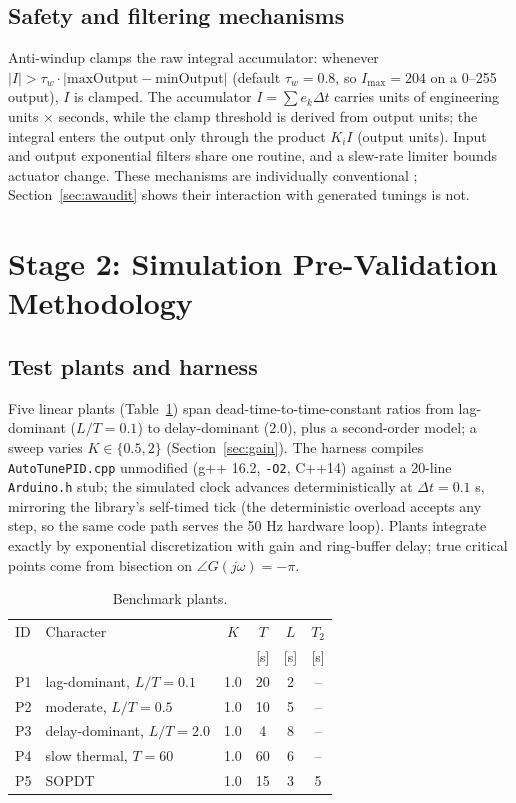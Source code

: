 \documentclass[10pt,twocolumn]{article}
\begin{document}
\subsection{Safety and filtering mechanisms}

Anti-windup clamps the raw integral accumulator: whenever $|I| > \tau_w \cdot |\text{maxOutput} - \text{minOutput}|$ (default $\tau_w = 0.8$, so $I_{\max} = 204$ on a 0--255 output), $I$ is clamped. The accumulator $I = \sum e_k \Delta t$ carries units of engineering units $\times$ seconds, while the clamp threshold is derived from output units; the integral enters the output only through the product $K_i I$ (output units). Input and output exponential filters share one routine, and a slew-rate limiter bounds actuator change. These mechanisms are individually conventional \cite{astrom2006, visioli2006}; Section~\ref{sec:awaudit} shows their interaction with generated tunings is not.

\section{Stage 2: Simulation Pre-Validation Methodology}
\label{sec:simmethod}

\subsection{Test plants and harness}

Five linear plants (Table~\ref{tab:plants}) span dead-time-to-time-constant ratios from lag-dominant ($L/T = 0.1$) to delay-dominant ($2.0$), plus a second-order model; a sweep varies $K \in \{0.5, 2\}$ (Section~\ref{sec:gain}). The harness compiles \texttt{AutoTunePID.cpp} unmodified (g++ 16.2, \texttt{-O2}, C++14) against a 20-line \texttt{Arduino.h} stub; the simulated clock advances deterministically at $\Delta t = 0.1$ s, mirroring the library's self-timed tick (the deterministic overload accepts any step, so the same code path serves the 50 Hz hardware loop). Plants integrate exactly by exponential discretization with gain and ring-buffer delay; true critical points come from bisection on $\angle G(j\omega) = -\pi$.

\begin{table}[t]
\centering
\caption{Benchmark plants.}
\label{tab:plants}
\small
\begin{tabular}{@{}llcccc@{}}
\toprule
ID & Character & $K$ & $T$ & $L$ & $T_2$ \\
 &  &  & [s] & [s] & [s] \\
\midrule
P1 & lag-dominant, $L/T{=}0.1$ & 1.0 & 20 & 2 & -- \\
P2 & moderate, $L/T{=}0.5$ & 1.0 & 10 & 5 & -- \\
P3 & delay-dominant, $L/T{=}2.0$ & 1.0 & 4 & 8 & -- \\
P4 & slow thermal, $T{=}60$ & 1.0 & 60 & 6 & -- \\
P5 & SOPDT & 1.0 & 15 & 3 & 5 \\
\bottomrule
\end{tabular}
\end{table}
\end{document}
